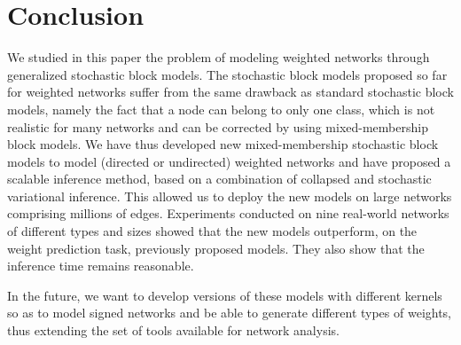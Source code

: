 \section{Conclusion}
\label{sec:concl}

We studied in this paper the problem of modeling weighted networks through generalized stochastic block models. The stochastic block models proposed so far for weighted networks suffer from the same drawback as standard stochastic block models, namely the fact that a node can belong to only one class, which is not realistic for many networks and can be corrected by using mixed-membership block models. We have thus developed new mixed-membership stochastic block models to model (directed or undirected) weighted networks and have proposed a scalable inference method, based on a combination of collapsed and stochastic variational inference. This allowed us to deploy the new models on large networks comprising millions of edges. Experiments conducted on nine real-world networks of different types and sizes showed that the new models outperform, on the weight prediction task, previously proposed models. They also show that the inference time remains reasonable.

In the future, we want to develop versions of these models with different kernels so as to model signed networks and be able to generate different types of weights, thus extending the set of tools available for network analysis.
